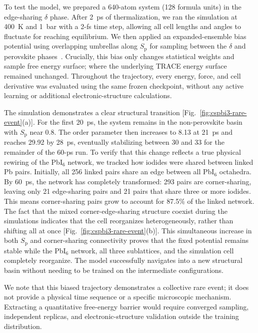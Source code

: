 \documentclass[aps,prx,preprint,notitlepage,superscriptaddress,nofootinbib,floatfix]{revtex4-2}
\begin{document}
To test the model, we prepared a 640-atom system (128 formula units) in the edge-sharing $\delta$ phase. After 2~ps of thermalization, we ran the simulation at 400~K and 1~bar with a 2-fs time step, allowing all cell lengths and angles to fluctuate for reaching equilibrium. We then applied an expanded-ensemble bias potential using overlapping umbrellas along $S_{\mathrm p}$ for sampling between the $\delta$ and perovskite phases~\cite{plumed2014,invernizzi2020}. Crucially, this bias only changes statistical weights and sample free energy surface; where the underlying TRACE energy surface remained unchanged. Throughout the trajectory, every energy, force, and cell derivative was evaluated using the same frozen checkpoint, without any active learning or additional electronic-structure calculations.

The simulation demonstrates a clear structural transition [Fig.~\ref{fig:cspbi3-rare-event}(a)]. For the first 20~ps, the system remains in the non-perovskite basin with $S_{\mathrm p}$ near 0.8. The order parameter then increases to 8.13 at 21~ps and reaches 29.92 by 28~ps, eventually stabilizing between 30 and 33 for the remainder of the 60-ps run. To verify that this change reflects a true physical rewiring of the PbI$_6$ network, we tracked how iodides were shared between linked Pb pairs. Initially, all 256 linked pairs share an edge between all PbI$_6$ octahedra. By 60~ps, the network has completely transformed: 293 pairs are corner-sharing, leaving only 21 edge-sharing pairs and 21 pairs that share three or more iodides. This means corner-sharing pairs grow to account for 87.5\% of the linked network. The fact that the mixed corner-edge-sharing structure coexist during the simulations indicates that the cell reorganizes heterogeneously, rather than shifting all at once [Fig.~\ref{fig:cspbi3-rare-event}(b)]. This simultaneous increase in both $S_{\mathrm p}$ and corner-sharing connectivity proves that the fixed potential remains stable while the PbI$_6$ network, all three sublattices, and the simulation cell completely reorganize. The model successfully navigates into a new structural basin without needing to be trained on the intermediate configurations. 

We note that this biased trajectory demonstrates a collective rare event; it does not provide a physical time sequence or a specific microscopic mechanism. Extracting a quantitative free-energy barrier would require converged sampling, independent replicas, and electronic-structure validation outside the training distribution.
\end{document}
